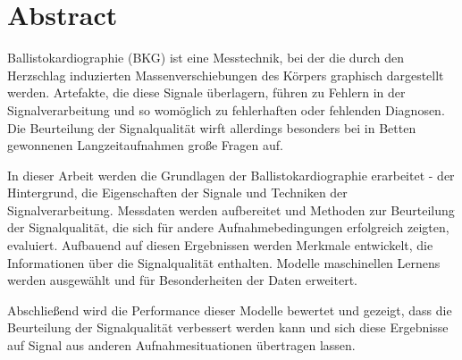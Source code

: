\clearpage
\chapter*{Abstract}\label{abstract}


Ballistokardiographie (BKG) ist eine Messtechnik, bei der die durch den Herzschlag induzierten Massenverschiebungen des Körpers graphisch dargestellt werden. Artefakte, die diese Signale überlagern, führen zu Fehlern in der Signalverarbeitung und so womöglich zu fehlerhaften oder fehlenden Diagnosen. Die Beurteilung der Signalqualität wirft allerdings besonders bei in Betten gewonnenen Langzeitaufnahmen große Fragen auf. 

In dieser Arbeit werden die Grundlagen der Ballistokardiographie erarbeitet - der Hintergrund, die Eigenschaften der Signale und Techniken der Signalverarbeitung. Messdaten werden aufbereitet und Methoden zur Beurteilung der Signalqualität, die sich für andere Aufnahmebedingungen erfolgreich zeigten, evaluiert. Aufbauend auf diesen Ergebnissen werden Merkmale entwickelt, die Informationen über die Signalqualität enthalten. Modelle maschinellen Lernens werden ausgewählt und für Besonderheiten der Daten erweitert.

Abschließend wird die Performance dieser Modelle bewertet und gezeigt, dass die Beurteilung der Signalqualität verbessert werden kann und sich diese Ergebnisse auf Signal aus anderen Aufnahmesituationen übertragen lassen.

